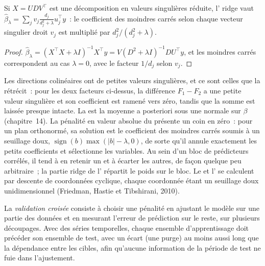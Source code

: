 \begin{proposition}\label{prop:qm:linear-models-under-stress:ridge}
Si $X = UDV^\top$ est une décomposition en valeurs singulières réduite, l' ridge vaut $\hat\beta_\lambda = \sum_jv_j\frac{d_j}{d_j^2 + \lambda}u_j^\top y$~:
le coefficient des moindres carrés selon chaque vecteur singulier droit $v_j$ est multiplié par $d_j^2/(d_j^2 + \lambda)$.
\end{proposition}

\begin{proof}
$\hat\beta_\lambda = (X^\top X + \lambda I)^{-1}X^\top y = V(D^2 + \lambda I)^{-1}DU^\top y$, et les moindres carrés correspondent au cas $\lambda = 0$, avec le facteur
$1/d_j$ selon $v_j$.
\end{proof}

Les directions colinéaires ont de petites valeurs singulières, et ce sont celles que la  rétrécit~: pour les deux facteurs ci-dessus, la différence $F_1 - F_2$ a
une petite valeur singulière et son coefficient est ramené vers zéro, tandis que la somme est laissée presque intacte. La  est la moyenne a posteriori sous une  normale
sur $\beta$ (chapitre~14). La pénalité en valeur absolue du  présente un coin en zéro~: pour un plan orthonormé, sa solution est le
coefficient des moindres carrés soumis à un seuillage doux, $\operatorname{sign}(b)\max(|b| - \lambda, 0)$, de sorte qu'il annule exactement les petits coefficients et
sélectionne les variables. Au sein d'un bloc de prédicteurs corrélés, il tend à en retenir un et à écarter les autres, de façon quelque peu arbitraire~; la partie
ridge de l' répartit le poids sur le bloc. Le  et l' se calculent par descente de coordonnées cyclique, chaque coordonnée étant un
seuillage doux unidimensionnel (Friedman, Hastie et Tibshirani, 2010).

\begin{definition}\label{def:qm:linear-models-under-stress:cv}
La \emph{validation croisée} consiste à choisir une pénalité en ajustant le modèle sur une partie des données et en mesurant l'erreur de prédiction sur le reste,
sur plusieurs découpages. Avec des séries temporelles, chaque ensemble d'apprentissage doit précéder son ensemble de test, avec un écart (une purge) au moins aussi long que la dépendance
entre les cibles, afin qu'aucune information de la période de test ne fuie dans l'ajustement.
\end{definition}

